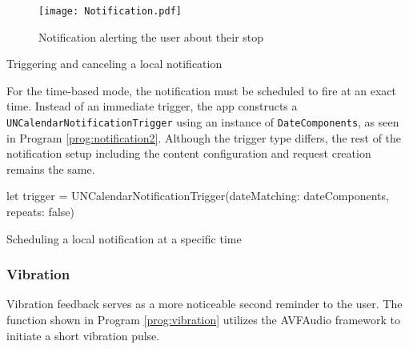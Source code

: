 \begin{figure}[htbp]
    \centering
    \texttt{[image: Notification.pdf]}
    \caption{Notification alerting the user about their stop}
    \label{fig:notification}
\end{figure}

\begin{program}[htbp]
\caption{Triggering and canceling a local notification}
\label{prog:notification}
\end{program}

For the time-based mode, the notification must be scheduled to fire at an exact time.
Instead of an immediate trigger, the app constructs a \lstinline{UNCalendarNotificationTrigger} using an instance of \lstinline{DateComponents}, as seen in Program \ref{prog:notification2}. 
Although the trigger type differs, the rest of the notification setup including the content configuration and request creation remains the same.

\begin{program}[htbp]
\begin{SwiftCode}
let trigger = UNCalendarNotificationTrigger(dateMatching: dateComponents, repeats: false)\end{SwiftCode}
\caption{Scheduling a local notification at a specific time}
\label{prog:notification2}
\end{program}

\subsubsection{Vibration}
Vibration feedback serves as a more noticeable second reminder to the user.
The function shown in Program \ref{prog:vibration} utilizes the AVFAudio framework to initiate a short vibration pulse.

